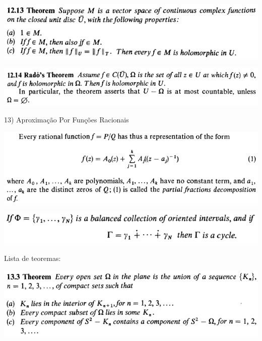\documentclass[12pt]{article}
\begin{document}
		\begin{center}
		\includegraphics{12ponto13}
		\end{center}

		\begin{center}
		\includegraphics[scale=0.9]{12ponto14}
		\end{center}

\vspace{3mm}

13) Aproxima\c{c}\~ao Por Fun\c{c}\~oes Racionais

\vspace{3mm}

		\begin{center}
		\includegraphics[scale=0.9]{d13ponto2}
		\end{center}

		\begin{center}
		\includegraphics{d13ponto4}
		\end{center}

Lista de teoremas:

		\begin{center}
		\includegraphics{13ponto3}
		\end{center}
\end{document}

